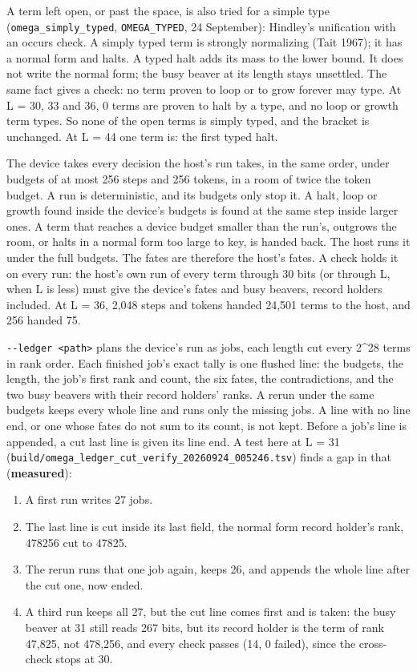 A term left open, or past the space, is also tried for a simple type (\texttt{omega\_\allowbreak{}simply\_\allowbreak{}typed}, \texttt{OMEGA\_\allowbreak{}TYPED}, 24 September): Hindley's unification with an occurs check. A simply typed term is strongly normalizing (Tait 1967); it has a normal form and halts. A typed halt adds its mass to the lower bound. It does not write the normal form; the busy beaver at its length stays unsettled. The same fact gives a check: no term proven to loop or to grow forever may type. At L = 30, 33 and 36, 0 terms are proven to halt by a type, and no loop or growth term types. So none of the open terms is simply typed, and the bracket is unchanged. At L = 44 one term is: the first typed halt.

The device takes every decision the host's run takes, in the same order, under budgets of at most 256 steps and 256 tokens, in a room of twice the token budget. A run is deterministic, and its budgets only stop it. A halt, loop or growth found inside the device's budgets is found at the same step inside larger ones. A term that reaches a device budget smaller than the run's, outgrows the room, or halts in a normal form too large to key, is handed back. The host runs it under the full budgets. The fates are therefore the host's fates. A check holds it on every run: the host's own run of every term through 30 bits (or through L, when L is less) must give the device's fates and busy beavers, record holders included. At L = 36, 2,048 steps and tokens handed 24,501 terms to the host, and 256 handed 75.

\texttt{-\allowbreak{}-\allowbreak{}ledger <path>} plans the device's run as jobs, each length cut every 2\textasciicircum{}28 terms in rank order. Each finished job's exact tally is one flushed line: the budgets, the length, the job's first rank and count, the six fates, the contradictions, and the two busy beavers with their record holders' ranks. A rerun under the same budgets keeps every whole line and runs only the missing jobs. A line with no line end, or one whose fates do not sum to its count, is not kept. Before a job's line is appended, a cut last line is given its line end. A test here at L = 31 (\texttt{build/\allowbreak{}omega\_\allowbreak{}ledger\_\allowbreak{}cut\_\allowbreak{}verify\_\allowbreak{}20260924\_\allowbreak{}005246.\allowbreak{}tsv}) finds a gap in that (\textbf{measured}):

\begin{enumerate}
\item A first run writes 27 jobs.
\item The last line is cut inside its last field, the normal form record holder's rank, 478256 cut to 47825.
\item The rerun runs that one job again, keeps 26, and appends the whole line after the cut one, now ended.
\item A third run keeps all 27, but the cut line comes first and is taken: the busy beaver at 31 still reads 267 bits, but its record holder is the term of rank 47,825, not 478,256, and every check passes (14, 0 failed), since the cross-check stops at 30.
\end{enumerate}

